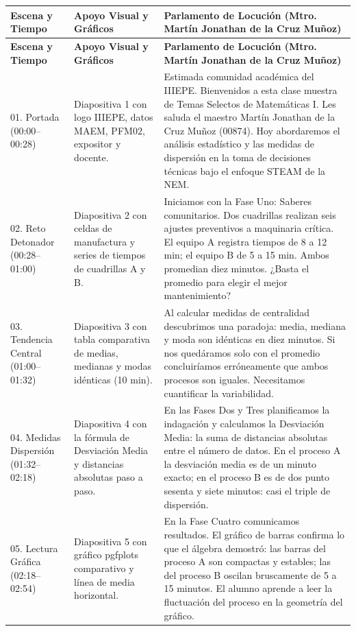 \documentclass[spanish,letterpaper,oneside]{article}
\begin{document}
{\small{}\renewcommand{\arraystretch}{1.2}
\begin{longtable}{|p{2.2cm}|p{5.5cm}|p{6.8cm}|}\hline
\rowcolor{iiiepePale} \textbf{Escena y Tiempo} & \textbf{Apoyo Visual y Gráficos} & \textbf{Parlamento de Locución (Mtro. Martín Jonathan de la Cruz Muñoz)} \\\hline
\endfirsthead
\hline
\rowcolor{iiiepePale} \textbf{Escena y Tiempo} & \textbf{Apoyo Visual y Gráficos} & \textbf{Parlamento de Locución (Mtro. Martín Jonathan de la Cruz Muñoz)} \\\hline
\endhead
01. Portada (00:00--00:28) & Diapositiva 1 con logo IIIEPE, datos MAEM, PFM02, expositor y docente. & Estimada comunidad académica del IIIEPE. Bienvenidos a esta clase muestra de Temas Selectos de Matemáticas I. Les saluda el maestro Martín Jonathan de la Cruz Muñoz (00874). Hoy abordaremos el análisis estadístico y las medidas de dispersión en la toma de decisiones técnicas bajo el enfoque STEAM de la NEM. \\\hline
02. Reto Detonador (00:28--01:00) & Diapositiva 2 con celdas de manufactura y series de tiempos de cuadrillas A y B. & Iniciamos con la Fase Uno: Saberes comunitarios. Dos cuadrillas realizan seis ajustes preventivos a maquinaria crítica. El equipo A registra tiempos de 8 a 12 min; el equipo B de 5 a 15 min. Ambos promedian diez minutos. ¿Basta el promedio para elegir el mejor mantenimiento? \\\hline
03. Tendencia Central (01:00--01:32) & Diapositiva 3 con tabla comparativa de medias, medianas y modas idénticas (10 min). & Al calcular medidas de centralidad descubrimos una paradoja: media, mediana y moda son idénticas en diez minutos. Si nos quedáramos solo con el promedio concluiríamos erróneamente que ambos procesos son iguales. Necesitamos cuantificar la variabilidad. \\\hline
04. Medidas Dispersión (01:32--02:18) & Diapositiva 4 con la fórmula de Desviación Media y distancias absolutas paso a paso. & En las Fases Dos y Tres planificamos la indagación y calculamos la Desviación Media: la suma de distancias absolutas entre el número de datos. En el proceso A la desviación media es de un minuto exacto; en el proceso B es de dos punto sesenta y siete minutos: casi el triple de dispersión. \\\hline
05. Lectura Gráfica (02:18--02:54) & Diapositiva 5 con gráfico pgfplots comparativo y línea de media horizontal. & En la Fase Cuatro comunicamos resultados. El gráfico de barras confirma lo que el álgebra demostró: las barras del proceso A son compactas y estables; las del proceso B oscilan bruscamente de 5 a 15 minutos. El alumno aprende a leer la fluctuación del proceso en la geometría del gráfico. \\\hline

\end{longtable}}
\end{document}
